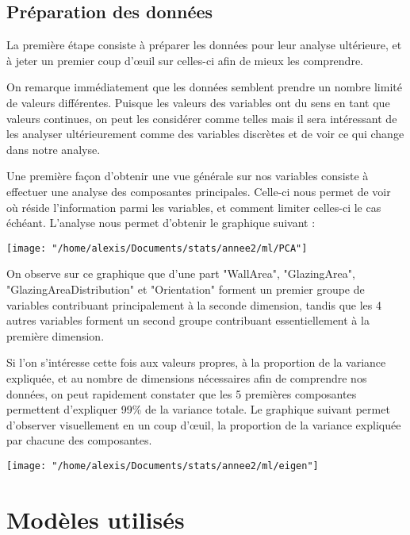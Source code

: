\documentclass[11pt,a4paper]{article}
\begin{document}
\subsection{Préparation des données}

La première étape consiste à préparer les données pour leur analyse ultérieure, et à jeter un premier coup d'\oe uil sur celles-ci afin de mieux les comprendre. 

On remarque immédiatement que les données semblent prendre un nombre limité de valeurs différentes. Puisque les valeurs des variables ont du sens en tant que valeurs continues, on peut les considérer comme telles mais il sera intéressant de les analyser ultérieurement comme des variables discrètes et de voir ce qui change dans notre analyse. 

Une première façon d'obtenir une vue générale sur nos variables consiste à effectuer une analyse des composantes principales. Celle-ci nous permet de voir où réside l'information parmi les variables, et comment limiter celles-ci le cas échéant. L'analyse nous permet d'obtenir le graphique suivant : 

\begin{center}
\texttt{[image: "/home/alexis/Documents/stats/annee2/ml/PCA"]}
\end{center}

On observe sur ce graphique que d'une part "WallArea", "GlazingArea", "GlazingAreaDistribution" et "Orientation" forment un premier groupe de variables contribuant principalement à la seconde dimension, tandis que les 4 autres variables forment un second groupe contribuant essentiellement à la première dimension.

Si l'on s'intéresse cette fois aux valeurs propres, à la proportion de la variance expliquée, et au nombre de dimensions nécessaires afin de comprendre nos données, on peut rapidement constater que les 5 premières composantes permettent d'expliquer 99\% de la variance totale. Le graphique suivant permet d'observer visuellement en un coup d'\oe uil, la proportion de la variance expliquée par chacune des composantes.

\begin{center}
\texttt{[image: "/home/alexis/Documents/stats/annee2/ml/eigen"]}
\end{center}

\section{Modèles utilisés}
\end{document}
